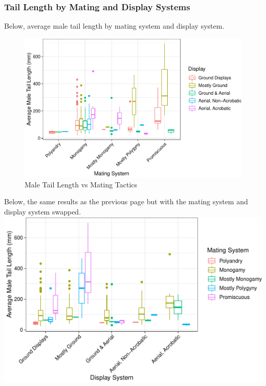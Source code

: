 \documentclass[
  12pt,
]{article}
\begin{document}
\newpage

\hypertarget{tail-length-by-mating-and-display-systems}{%
\subsubsection{Tail Length by Mating and Display
Systems}\label{tail-length-by-mating-and-display-systems}}

Below, average male tail length by mating system and display system.

\begin{figure}
\centering
\includegraphics{Project_Code_files/figure-latex/q-2-plots-1.pdf}
\caption{Male Tail Length vs Mating Tactics}
\end{figure}

\newpage

Below, the same results as the previous page but with the mating system
and display system swapped.
\includegraphics{Project_Code_files/figure-latex/q-2-plots2-1.pdf}
\end{document}
